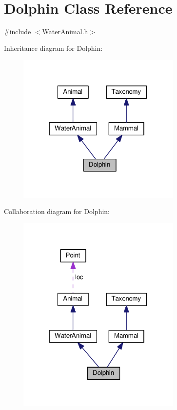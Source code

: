 \hypertarget{classDolphin}{}\section{Dolphin Class Reference}
\label{classDolphin}


{\ttfamily \#include $<$Water\+Animal.\+h$>$}



Inheritance diagram for Dolphin\+:
\nopagebreak
\begin{figure}[H]
\begin{center}
\leavevmode
\includegraphics[width=230pt]{classDolphin__inherit__graph}
\end{center}
\end{figure}


Collaboration diagram for Dolphin\+:
\nopagebreak
\begin{figure}[H]
\begin{center}
\leavevmode
\includegraphics[width=230pt]{classDolphin__coll__graph}
\end{center}
\end{figure}
